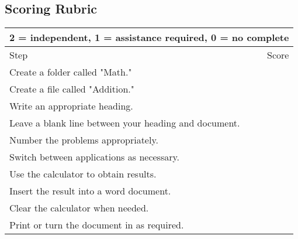\documentclass[10pt,letterpaper,twoside]{report}
\begin{document}
{{{\subsection{Scoring Rubric}
{
\renewcommand{\arraystretch}{1.5}
\begin{table}[!htbp]
	\centering
	\begin{tabular}{|l|r|}
		\hline
		\multicolumn{2}{|c|}{2 = independent, 1 = assistance required, 0 = no complete} \\
		\hline
		Step                                                  & Score \\[.5em]
		\hline
		Create a folder called "Math."                        &       \\ \hline	
		Create a file called "Addition."                      &       \\ \hline		
		Write an appropriate heading.                         &       \\ \hline
		Leave a blank line between your heading and document. &       \\ \hline		
		Number the problems appropriately.                    &       \\ \hline
		Switch between applications as necessary.             &       \\ \hline
		Use the calculator to obtain results.                 &       \\ \hline
		Insert the result into a word document.               &       \\ \hline
		Clear the calculator when needed.                     &       \\ \hline
		Print or turn the document in as required.            &       \\ \hline
	\end{tabular}
	
\end{table}

\clearpage
}}}}
\end{document}
